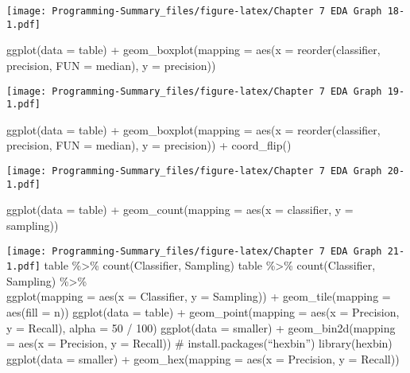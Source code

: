 \documentclass[
]{article}
\newenvironment{Shaded}{\begin{snugshade}}{\end{snugshade}}
\newcommand{\AttributeTok}[1]{\textcolor[rgb]{0.77,0.63,0.00}{#1}}
\newcommand{\FunctionTok}[1]{\textcolor[rgb]{0.00,0.00,0.00}{#1}}
\newcommand{\NormalTok}[1]{#1}
\newcommand{\SpecialCharTok}[1]{\textcolor[rgb]{0.00,0.00,0.00}{#1}}
\begin{document}
\texttt{[image: Programming-Summary\_files/figure-latex/Chapter 7 EDA Graph 18-1.pdf]}

\begin{Shaded}
\begin{Highlighting}[]
\FunctionTok{ggplot}\NormalTok{(}\AttributeTok{data =}\NormalTok{ table) }\SpecialCharTok{+}
  \FunctionTok{geom\_boxplot}\NormalTok{(}\AttributeTok{mapping =} \FunctionTok{aes}\NormalTok{(}\AttributeTok{x =} \FunctionTok{reorder}\NormalTok{(classifier, precision, }\AttributeTok{FUN =}\NormalTok{ median), }\AttributeTok{y =}\NormalTok{ precision))}
\end{Highlighting}
\end{Shaded}

\texttt{[image: Programming-Summary\_files/figure-latex/Chapter 7 EDA Graph 19-1.pdf]}

\begin{Shaded}
\begin{Highlighting}[]
\FunctionTok{ggplot}\NormalTok{(}\AttributeTok{data =}\NormalTok{ table) }\SpecialCharTok{+}
  \FunctionTok{geom\_boxplot}\NormalTok{(}\AttributeTok{mapping =} \FunctionTok{aes}\NormalTok{(}\AttributeTok{x =} \FunctionTok{reorder}\NormalTok{(classifier, precision, }\AttributeTok{FUN =}\NormalTok{ median), }\AttributeTok{y =}\NormalTok{ precision)) }\SpecialCharTok{+}
  \FunctionTok{coord\_flip}\NormalTok{()}
\end{Highlighting}
\end{Shaded}

\texttt{[image: Programming-Summary\_files/figure-latex/Chapter 7 EDA Graph 20-1.pdf]}

\begin{Shaded}
\begin{Highlighting}[]
\FunctionTok{ggplot}\NormalTok{(}\AttributeTok{data =}\NormalTok{ table) }\SpecialCharTok{+}
  \FunctionTok{geom\_count}\NormalTok{(}\AttributeTok{mapping =} \FunctionTok{aes}\NormalTok{(}\AttributeTok{x =}\NormalTok{ classifier, }\AttributeTok{y =}\NormalTok{ sampling))}
\end{Highlighting}
\end{Shaded}

\texttt{[image: Programming-Summary\_files/figure-latex/Chapter 7 EDA Graph 21-1.pdf]}
table \%\textgreater\% count(Classifier, Sampling) table
\%\textgreater\% count(Classifier, Sampling) \%\textgreater\%\\
ggplot(mapping = aes(x = Classifier, y = Sampling)) + geom\_tile(mapping
= aes(fill = n)) ggplot(data = table) + geom\_point(mapping = aes(x =
Precision, y = Recall), alpha = 50 / 100) ggplot(data = smaller) +
geom\_bin2d(mapping = aes(x = Precision, y = Recall)) \#
install.packages(``hexbin'') library(hexbin) ggplot(data = smaller) +
geom\_hex(mapping = aes(x = Precision, y = Recall))
\end{document}

